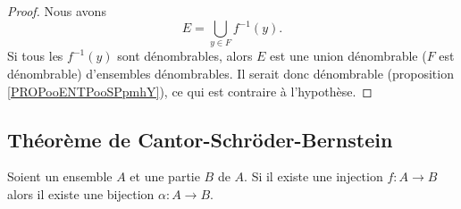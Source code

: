 \begin{proof}
    Nous avons
    \begin{equation}
        E=\bigcup_{y\in F}f^{-1}(y).
    \end{equation}
    Si tous les \( f^{-1}(y)\) sont dénombrables, alors \( E\) est une union dénombrable (\( F\) est dénombrable) d'ensembles dénombrables. Il serait donc dénombrable (proposition \ref{PROPooENTPooSPpmhY}), ce qui est contraire à l'hypothèse.
\end{proof}

\subsection{Théorème de Cantor-Schröder-Bernstein}

\begin{lemma}     \label{LEMooTNMHooBpdzab}
    Soient un ensemble \( A\) et une partie \( B\) de \( A\). Si il existe une injection \( f\colon A\to B\) alors il existe une bijection \( \alpha\colon A\to B\).
\end{lemma}

